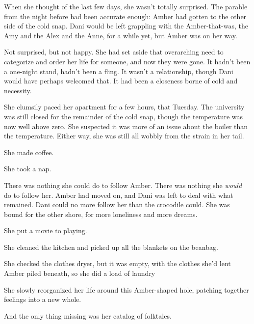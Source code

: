 When she thought of the last few days, she wasn't totally surprised. The parable from the night before had been accurate enough: Amber had gotten to the other side of the cold snap. Dani would be left grappling with the Amber-that-was, the Amy and the Alex and the Anne, for a while yet, but Amber was on her way.

Not surprised, but not happy. She had set aside that overarching need to categorize and order her life for someone, and now they were gone. It hadn't been a one-night stand, hadn't been a fling. It wasn't a relationship, though Dani would have perhaps welcomed that. It had been a closeness borne of cold and necessity.

She clumsily paced her apartment for a few hours, that Tuesday. The university was still closed for the remainder of the cold snap, though the temperature was now well above zero. She suspected it was more of an issue about the boiler than the temperature. Either way, she was still all wobbly from the strain in her tail.

She made coffee.

She took a nap.

There was nothing she could do to follow Amber. There was nothing she \emph{would} do to follow her. Amber had moved on, and Dani was left to deal with what remained. Dani could no more follow her than the crocodile could. She was bound for the other shore, for more loneliness and more dreams.

She put a movie to playing.

She cleaned the kitchen and picked up all the blankets on the beanbag.

She checked the clothes dryer, but it was empty, with the clothes she'd lent Amber piled beneath, so she did a load of laundry

She slowly reorganized her life around this Amber-shaped hole, patching together feelings into a new whole.

And the only thing missing was her catalog of folktales.
